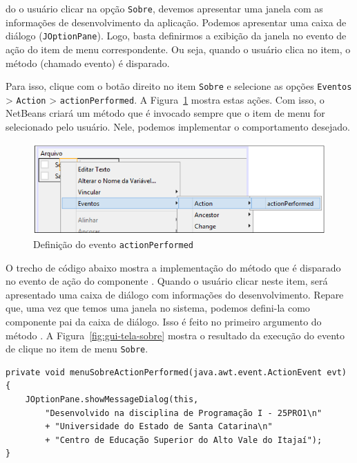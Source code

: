 do o usuário clicar na opção \texttt{Sobre}, devemos apresentar uma janela com as informações de desenvolvimento da aplicação. Podemos apresentar uma caixa de diálogo (\texttt{JOptionPane}). Logo, basta definirmos a exibição da janela no evento de ação do item de menu correspondente. Ou seja, quando o usuário clica no item, o método (chamado evento) é disparado.

Para isso, clique com o botão direito no item \texttt{Sobre} e selecione as opções \texttt{Eventos} > \texttt{Action} > \texttt{actionPerformed}. A Figura~\ref{fig:gui-action-performed} mostra estas ações. Com isso, o NetBeans criará um método que é invocado sempre que o item de menu for selecionado pelo usuário. Nele, podemos implementar o comportamento desejado.

\begin{figure}[h]
	\centering
	\includegraphics[width=0.4\textheight]{img/gui-action-performed}
	\caption{Definição do evento \texttt{actionPerformed}}
	\label{fig:gui-action-performed}
\end{figure}

O trecho de código abaixo mostra a implementação do método que é disparado no evento de ação do componente . Quando o usuário clicar neste item, será apresentado uma caixa de diálogo com informações do desenvolvimento. Repare que, uma vez que temos uma janela no sistema, podemos defini-la como componente pai da caixa de diálogo. Isso é feito no primeiro argumento do método . A Figura~\ref{fig:gui-tela-sobre} mostra o resultado da execução do evento de clique no item de menu \texttt{Sobre}.

\begin{verbatim}
private void menuSobreActionPerformed(java.awt.event.ActionEvent evt) {
	JOptionPane.showMessageDialog(this,
		"Desenvolvido na disciplina de Programação I - 25PRO1\n"
		+ "Universidade do Estado de Santa Catarina\n"
		+ "Centro de Educação Superior do Alto Vale do Itajaí");
}
\end{verbatim}

